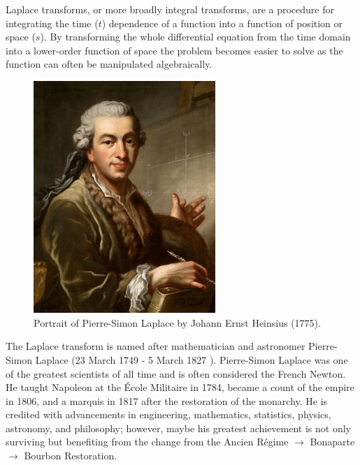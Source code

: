 \documentclass[12pt,letter]{article}
\begin{document}
\begin{review}
	\label{sec:Laplace_review}
				
		Laplace transforms, or more broadly integral transforms, are a procedure for integrating the time ($t$) dependence of a function into a function of position or space ($s$). By transforming the whole differential equation from the time domain into a lower-order function of space the problem becomes easier to solve as the function can often be manipulated algebraically. 

		\begin{figure}[H]
			\centering
			\includegraphics[width=2.71in]{../figures/Pierre-Simon_de_Laplace.jpg}
			\caption{Portrait of Pierre-Simon Laplace by Johann Ernst Heinsius (1775).\protect\footnotemark[1] }
			\label{fig:fragility_curve}
		\end{figure}


		The Laplace transform is named after mathematician and astronomer Pierre-Simon Laplace (23 March 1749 - 5 March 1827 ). Pierre-Simon Laplace was one of the greatest scientists of all time and is often considered the French Newton. He taught Napoleon at the \'Ecole Militaire in 1784, became a count of the empire in 1806, and a marquis in 1817 after the restoration of the monarchy. He is credited with advancements in engineering, mathematics, statistics, physics, astronomy, and philosophy; however, maybe his greatest achievement is not only surviving but benefiting from the change from the Ancien R\'egime $\rightarrow$ Bonaparte $\rightarrow$ Bourbon Restoration. 


\end{review}
\end{document}
